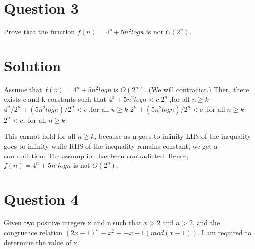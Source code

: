 \documentclass[11pt]{article}
\begin{document}
\newpage
\section*{Question 3}
Prove that the function $f(n) = 4^n +5n^2logn$ is not $O(2^n)$.
\section*{Solution}
Assume that  $f(n) = 4^n +5n^2logn$ is $O(2^n)$. (We will contradict.) \newline \newline
Then, there exists c and k constants such that \newline \newline
\indent\indent $4^n +5n^2logn < c.2^n $ ,\space  \space for all $n \geq k$ \newline \newline
\indent \indent $4^n/2^n + (5n^2logn)/2^n < c$ ,\space  \space for all $n \geq k$ \newline \newline
\indent \indent $2^n + (5n^2logn)/2^n < c$ ,\space  \space for all $n \geq k$ \newline \newline
\indent \indent $2^n < c,$ for all $n \geq k$ \newline \newline

\noindent
This cannot hold for all $n \geq k$, because as n goes to infinity LHS of the inequality goes to infinity while RHS of the inequality remains constant, we get a
contradiction. \newline \newline
The assumption has been contradicted.\newline \newline
Hence,$f(n) = 4^n +5n^2logn$ is not $O(2^n)$.

\newpage
\section*{Question 4}
Given two positive integers x and n such that $x > 2$ and $n > 2$, and the congruence relation \newline $(2x-1)^n - x^2 \equiv -x -1 (mod(x-1))$. I am required to determine the value of x. 
\end{document}
